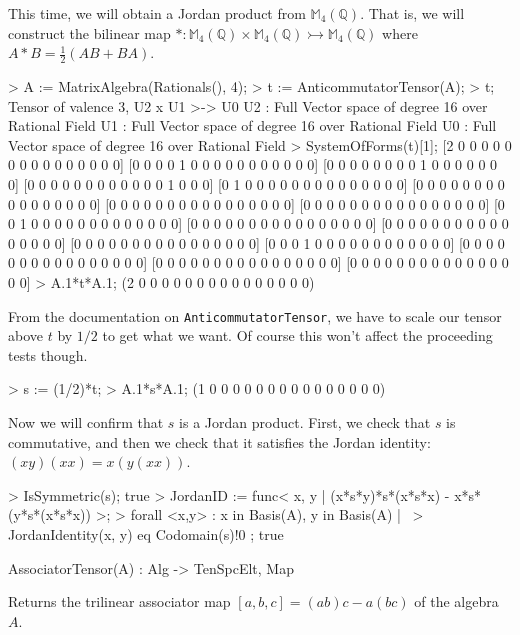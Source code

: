 \begin{example}[MatrixJordanAlgebra]
This time, we will obtain a Jordan product from $\mathbb{M}_4(\mathbb{Q})$. 
That is, we will construct the bilinear map $* : \mathbb{M}_4(\mathbb{Q})\times \mathbb{M}_4(\mathbb{Q})\rightarrowtail \mathbb{M}_4(\mathbb{Q})$ where $A*B = \frac{1}{2}(AB+BA)$. 
\begin{code}
> A := MatrixAlgebra(Rationals(), 4);
> t := AnticommutatorTensor(A);
> t;
Tensor of valence 3, U2 x U1 >-> U0
U2 : Full Vector space of degree 16 over Rational Field
U1 : Full Vector space of degree 16 over Rational Field
U0 : Full Vector space of degree 16 over Rational Field
> SystemOfForms(t)[1];
[2 0 0 0 0 0 0 0 0 0 0 0 0 0 0 0]
[0 0 0 0 1 0 0 0 0 0 0 0 0 0 0 0]
[0 0 0 0 0 0 0 0 1 0 0 0 0 0 0 0]
[0 0 0 0 0 0 0 0 0 0 0 0 1 0 0 0]
[0 1 0 0 0 0 0 0 0 0 0 0 0 0 0 0]
[0 0 0 0 0 0 0 0 0 0 0 0 0 0 0 0]
[0 0 0 0 0 0 0 0 0 0 0 0 0 0 0 0]
[0 0 0 0 0 0 0 0 0 0 0 0 0 0 0 0]
[0 0 1 0 0 0 0 0 0 0 0 0 0 0 0 0]
[0 0 0 0 0 0 0 0 0 0 0 0 0 0 0 0]
[0 0 0 0 0 0 0 0 0 0 0 0 0 0 0 0]
[0 0 0 0 0 0 0 0 0 0 0 0 0 0 0 0]
[0 0 0 1 0 0 0 0 0 0 0 0 0 0 0 0]
[0 0 0 0 0 0 0 0 0 0 0 0 0 0 0 0]
[0 0 0 0 0 0 0 0 0 0 0 0 0 0 0 0]
[0 0 0 0 0 0 0 0 0 0 0 0 0 0 0 0]
> A.1*t*A.1;
(2 0 0 0 0 0 0 0 0 0 0 0 0 0 0 0)
\end{code}

From the documentation on \texttt{AnticommutatorTensor}, we have to scale our tensor above $t$ by $1/2$ to get what we want.
Of course this won't affect the proceeding tests though.
\begin{code}
> s := (1/2)*t;
> A.1*s*A.1;
(1 0 0 0 0 0 0 0 0 0 0 0 0 0 0 0)
\end{code}

Now we will confirm that $s$ is a Jordan product. 
First, we check that $s$ is commutative, and then we check that it satisfies the Jordan identity: $(xy)(xx)=x(y(xx))$.
\begin{code}
> IsSymmetric(s);
true
> JordanID := func< x, y | (x*s*y)*s*(x*s*x) - x*s*(y*s*(x*s*x)) >;
> forall{ <x,y> : x in Basis(A), y in Basis(A) | \
>     JordanIdentity(x, y) eq Codomain(s)!0 };
true
\end{code}
\end{example}

\begin{intrinsics}
AssociatorTensor(A) : Alg -> TenSpcElt, Map
\end{intrinsics}

Returns the trilinear associator map $[a,b,c]=(ab)c-a(bc)$ of the algebra $A$.

